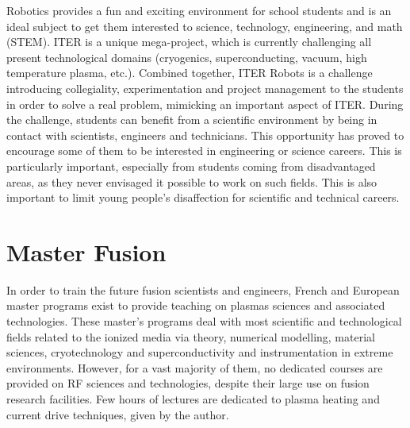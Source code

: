 
Robotics provides a fun and exciting environment for school students and is an ideal subject to get them interested to science, technology, engineering, and math (STEM). ITER is a unique mega-project, which is currently challenging all present technological domains (cryogenics, superconducting, vacuum, high temperature plasma, etc.). Combined together, ITER Robots is a challenge introducing collegiality, experimentation and project management to the students in order to solve a real problem, mimicking an important aspect of ITER. During the challenge, students can benefit from a scientific environment by being in contact with scientists, engineers and technicians. This opportunity has proved to encourage some of them to be interested in engineering or science careers. This is particularly important, especially from students coming from disadvantaged areas, as they never envisaged it possible to work on such fields. This is also important to limit young people's disaffection for scientific and technical careers. 


\section{Master Fusion}

In order to train the future fusion scientists and engineers, French and European master programs exist to provide teaching on plasmas sciences and associated technologies. These master's programs deal with most scientific and technological fields related to the ionized media via theory, numerical modelling, material sciences, cryotechnology and superconductivity and instrumentation in extreme environments. However, for a vast majority of them, no dedicated courses are provided on RF sciences and technologies, despite their large use on fusion research facilities. Few hours of lectures are dedicated to plasma heating and current drive techniques, given by the author. 

